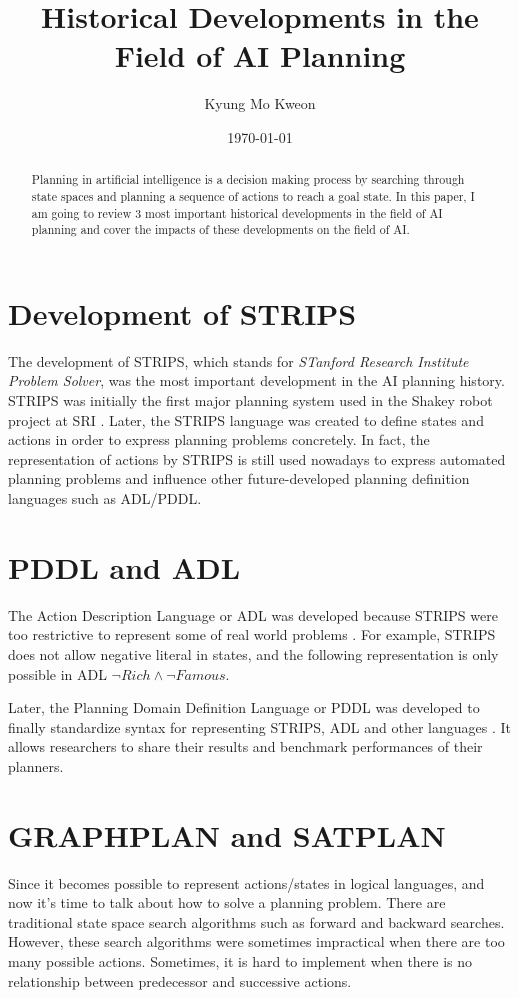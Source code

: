 \documentclass[letterpaper]{IEEEtran}
\title{\Large Historical Developments in the Field of AI Planning}
\author{Kyung Mo Kweon}
\date{\today}
\begin{document}
\maketitle
\thispagestyle{fancy}

\begin{abstract}
Planning in artificial intelligence is a decision making process by searching through state spaces and planning a sequence of actions to reach a goal state. In this paper, I am going to review 3 most important historical developments in the field of AI planning and cover the impacts of these developments on the field of AI.
\end{abstract}

\section{Development of STRIPS}
The development of STRIPS, which stands for \textit{STanford Research Institute Problem Solver}, was the most important development in the AI planning history. STRIPS was initially the first major planning system used in the Shakey robot project at SRI \cite{strips}. Later, the STRIPS language was created to define states and actions in order to express planning problems concretely. In fact, the representation of actions by STRIPS is still used nowadays to express automated planning problems and influence other future-developed planning definition languages such as ADL/PDDL.

\section{PDDL and ADL}
The Action Description Language or ADL was developed because STRIPS were too restrictive to represent some of real world problems \cite{ADL}.
For example, STRIPS does not allow negative literal in states, and the following representation is only possible in ADL $\neg Rich \wedge \neg Famous$. 

Later, the Planning Domain Definition Language or PDDL was developed to finally standardize syntax for representing STRIPS, ADL and other languages \cite{PDDL}. It allows researchers to share their results and benchmark performances of their planners.

\section{GRAPHPLAN and SATPLAN}
Since it becomes possible to represent actions/states in logical languages, and now it's time to talk about how to solve a planning problem. There are traditional state space search algorithms such as forward and backward searches. However, these search algorithms were sometimes impractical when there are too many possible actions. Sometimes, it is hard to implement when there is no relationship between predecessor and successive actions.
\end{document}
